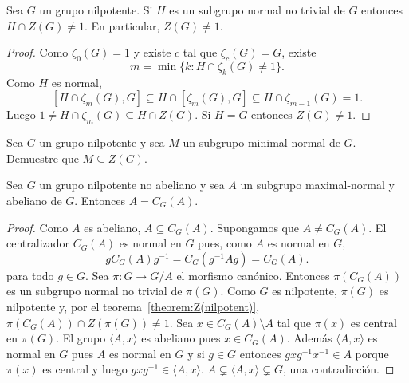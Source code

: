 
\begin{theorem}[Hirsch]
	\label{theorem:Z(nilpotent)}
	Sea $G$ un grupo nilpotente. Si $H$ es un subgrupo normal no trivial de $G$
	entonces $H\cap Z(G)\ne1$. En particular, $Z(G)\ne1$. 
\end{theorem}

\begin{proof}
	Como $\zeta_0(G)=1$ y existe $c$ tal que $\zeta_c(G)=G$, existe 
	\[
	m=\min\{k:H\cap\zeta_k(G)\ne1\}.
	\]
	Como $H$ es normal, 
	\[
	[H\cap\zeta_m(G),G]\subseteq H\cap[\zeta_m(G),G]\subseteq H\cap\zeta_{m-1}(G)=1.
	\]
	Luego $1\ne H\cap\zeta_m(G)\subseteq H\cap Z(G)$. Si $H=G$ entonces $Z(G)\ne1$. 
\end{proof}

\begin{exercise}
	Sea $G$ un grupo nilpotente y sea $M$ un subgrupo minimal-normal de $G$.
	Demuestre que $M\subseteq Z(G)$.
\end{exercise}


\begin{corollary}
	Sea $G$ un grupo nilpotente no abeliano y sea $A$ un subgrupo
	maximal-normal y abeliano de $G$. Entonces $A=C_G(A)$.
\end{corollary}

\begin{proof}
	Como $A$ es abeliano, $A\subseteq C_G(A)$. Supongamos que $A\ne C_G(A)$.
	El centralizador $C_G(A)$ es normal en $G$ pues, como $A$ es normal en $G$, 
	\[
		gC_G(A)g^{-1}=C_G(g^{-1}Ag)=C_G(A).
	\]
	para todo $g\in G$.  Sea $\pi\colon G\to G/A$ el morfismo canónico.
	Entonces $\pi(C_G(A))$ es un subgrupo normal no trivial de $\pi(G)$. Como
	$G$ es nilpotente, $\pi(G)$ es nilpotente y, por el
	teorema~\ref{theorem:Z(nilpotent)}, $\pi(C_G(A))\cap Z(\pi(G))\ne1$. Sea
	$x\in C_G(A)\setminus A$ tal que $\pi(x)$ es central en $\pi(G)$.  El grupo
	$\langle A,x\rangle$ es abeliano pues $x\in C_G(A)$. Además $\langle
	A,x\rangle$ es normal en $G$ pues $A$ es normal en $G$ y  si $g\in G$
	entonces $gxg^{-1}x^{-1}\in A$ porque $\pi(x)$ es central y luego
	$gxg^{-1}\in \langle A,x\rangle$.  $A\subsetneq \langle
	A,x\rangle\subsetneq G$, una contradicción.
\end{proof}

